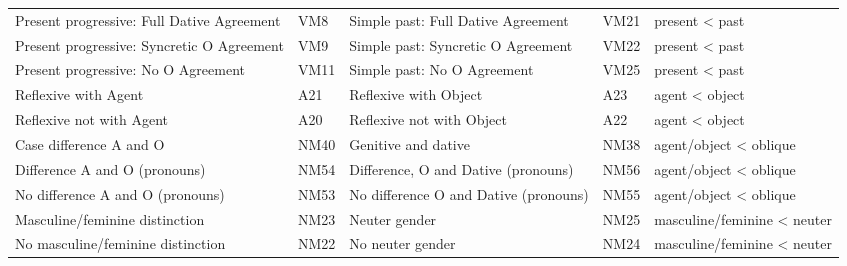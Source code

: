 \begin{longtable}{p{.3\linewidth}p{.05\linewidth}p{.3\linewidth}p{.05\linewidth}p{.2\linewidth}}
Present progressive: Full Dative Agreement & VM8 & Simple past: Full Dative Agreement & VM21 & present < past\\
Present progressive: Syncretic O Agreement & VM9 & Simple past: Syncretic O Agreement & VM22 & present < past\\
Present progressive: No O Agreement & VM11 & Simple past: No O Agreement & VM25 & present < past\\
Reflexive with Agent & A21 & Reflexive with Object & A23 & agent < object\\
Reflexive not with Agent & A20 & Reflexive not with Object & A22 & agent < object\\
Case difference A and O & NM40 & Genitive and dative & NM38 & agent/object < oblique\\
Difference A and O (pronouns) & NM54 & Difference, O and Dative (pronouns) & NM56 & agent/object < oblique\\
No difference A and O (pronouns) & NM53 & No difference O and Dative (pronouns) & NM55 & agent/object < oblique\\
Masculine/feminine distinction & NM23 & Neuter gender & NM25 & masculine/feminine < neuter\\
No masculine/feminine distinction & NM22 & No neuter gender & NM24 & masculine/feminine < neuter\\
\bottomrule
\end{longtable}
